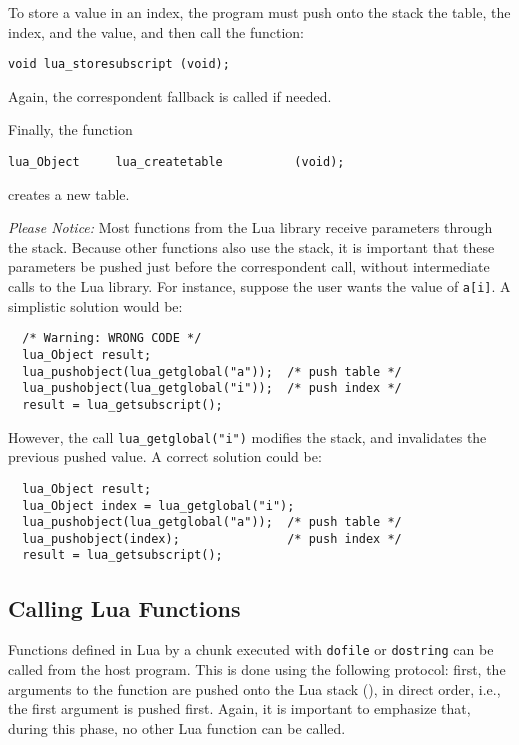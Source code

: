 To store a value in an index,
the program must push onto the stack the table, the index,
and the value,
and then call the function:
\begin{verbatim}
void lua_storesubscript (void);
\end{verbatim}
Again, the correspondent fallback is called if needed.

Finally, the function
\begin{verbatim}
lua_Object     lua_createtable          (void);
\end{verbatim}
creates a new table.

{\em Please Notice:\/}
Most functions from the Lua library receive parameters through the stack.
Because other functions also use the stack,
it is important that these
parameters be pushed just before the correspondent call,
without intermediate calls to the Lua library.
For instance, suppose the user wants the value of \verb'a[i]'.
A simplistic solution would be:
\begin{verbatim}
  /* Warning: WRONG CODE */
  lua_Object result;
  lua_pushobject(lua_getglobal("a"));  /* push table */
  lua_pushobject(lua_getglobal("i"));  /* push index */
  result = lua_getsubscript();
\end{verbatim}
However, the call \verb'lua_getglobal("i")' modifies the stack,
and invalidates the previous pushed value.
A correct solution could be:
\begin{verbatim}
  lua_Object result;
  lua_Object index = lua_getglobal("i");
  lua_pushobject(lua_getglobal("a"));  /* push table */
  lua_pushobject(index);               /* push index */
  result = lua_getsubscript();
\end{verbatim}

\subsection{Calling Lua Functions}
Functions defined in Lua by a chunk executed with
\verb'dofile' or \verb'dostring' can be called from the host program.
This is done using the following protocol:
first, the arguments to the function are pushed onto the Lua stack
(), in direct order, i.e., the first argument is pushed first.
Again, it is important to emphasize that, during this phase,
no other Lua function can be called.

